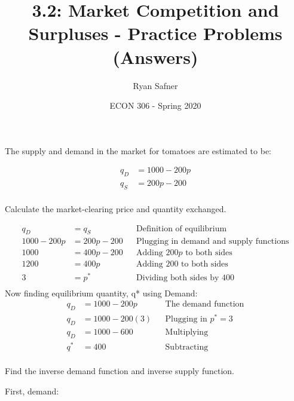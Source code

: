 \documentclass[12 pt]{exam}
\title{3.2: Market Competition and Surpluses - Practice Problems (Answers)}
\author{Ryan Safner}
\date{ECON 306 - Spring 2020}
\begin{document}
\maketitle

The supply and demand in the market for tomatoes are estimated to be:

$$\begin{aligned}
q_D&=1000-200p\\
q_S&=200p-200\\ \end{aligned}$$

\begin{questions}

\question Calculate the market-clearing price and quantity exchanged.

\begin{solution}
	\begin{align*}
	q_D&=q_S && \text{Definition of equilibrium}\\
	1000-200p&=200p-200 && \text{Plugging in demand and supply functions}\\
	1000&=400p-200 && \text{Adding } 200p \text{ to both sides}\\
	1200&=400p && \text{Adding } 200 \text{ to both sides}\\
	3&=p^* && \text{Dividing both sides by }400\\
	\end{align*}
	Now finding equilibrium quantity, q* using Demand: 
	\begin{align*}
	q_D&=1000-200p && \text{The demand function}\\
	q_D&=1000-200(3) && \text{Plugging in } p^*=3	\\
	q_D&=1000-600 && \text{Multiplying}\\
	q^*&=400 && \text{Subtracting}\\
	\end{align*}

\end{solution}

\question Find the inverse demand function and inverse supply function.

\begin{solution}

First, demand:


\end{solution}
\end{questions}
\end{document}
